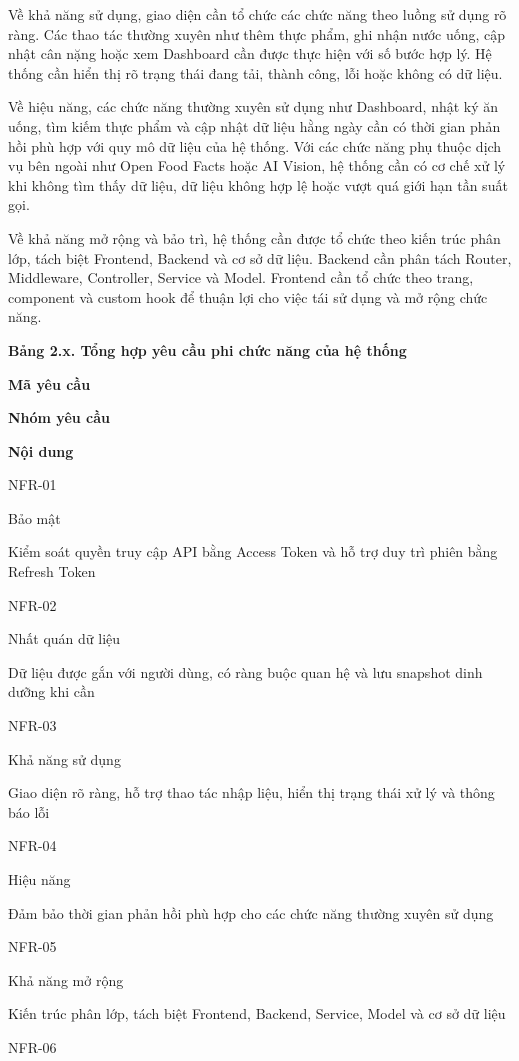 Về khả năng sử dụng, giao diện cần tổ chức các chức năng theo luồng sử dụng rõ ràng. Các thao tác thường xuyên như thêm thực phẩm, ghi nhận nước uống, cập nhật cân nặng hoặc xem Dashboard cần được thực hiện với số bước hợp lý. Hệ thống cần hiển thị rõ trạng thái đang tải, thành công, lỗi hoặc không có dữ liệu.

Về hiệu năng, các chức năng thường xuyên sử dụng như Dashboard, nhật ký ăn uống, tìm kiếm thực phẩm và cập nhật dữ liệu hằng ngày cần có thời gian phản hồi phù hợp với quy mô dữ liệu của hệ thống. Với các chức năng phụ thuộc dịch vụ bên ngoài như Open Food Facts hoặc AI Vision, hệ thống cần có cơ chế xử lý khi không tìm thấy dữ liệu, dữ liệu không hợp lệ hoặc vượt quá giới hạn tần suất gọi.

Về khả năng mở rộng và bảo trì, hệ thống cần được tổ chức theo kiến trúc phân lớp, tách biệt Frontend, Backend và cơ sở dữ liệu. Backend cần phân tách Router, Middleware, Controller, Service và Model. Frontend cần tổ chức theo trang, component và custom hook để thuận lợi cho việc tái sử dụng và mở rộng chức năng.

\textbf{Bảng 2.x. Tổng hợp yêu cầu phi chức năng của hệ thống}

\textbf{Mã yêu cầu}

\textbf{Nhóm yêu cầu}

\textbf{Nội dung}

NFR-01

Bảo mật

Kiểm soát quyền truy cập API bằng Access Token và hỗ trợ duy trì phiên bằng Refresh Token

NFR-02

Nhất quán dữ liệu

Dữ liệu được gắn với người dùng, có ràng buộc quan hệ và lưu snapshot dinh dưỡng khi cần

NFR-03

Khả năng sử dụng

Giao diện rõ ràng, hỗ trợ thao tác nhập liệu, hiển thị trạng thái xử lý và thông báo lỗi

NFR-04

Hiệu năng

Đảm bảo thời gian phản hồi phù hợp cho các chức năng thường xuyên sử dụng

NFR-05

Khả năng mở rộng

Kiến trúc phân lớp, tách biệt Frontend, Backend, Service, Model và cơ sở dữ liệu

NFR-06

